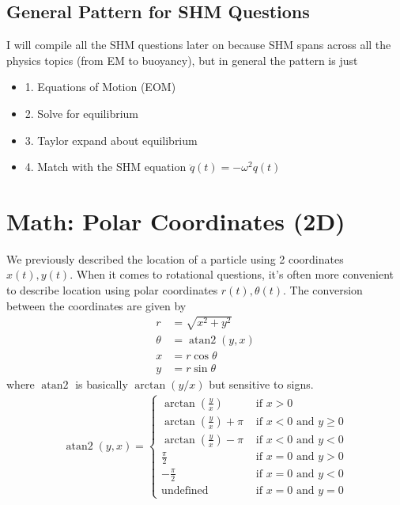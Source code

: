 \documentclass{article}
\begin{document}
\subsection{General Pattern for SHM Questions}
I will compile all the SHM questions later on because SHM spans across all the physics topics (from EM to buoyancy), but in general the pattern is just 
\begin{itemize}
    \item[] 1. Equations of Motion (EOM)
    \item[] 2. Solve for equilibrium
    \item[] 3. Taylor expand about equilibrium
    \item[] 4. Match with the SHM equation $\ddot q(t) = -\omega^2 q(t)$
\end{itemize}
\section{Math: Polar Coordinates (2D)}
\label{sec:polar}
We previously described the location of a particle using 2 coordinates $x(t),y(t)$. When it comes to rotational questions, it's often more convenient to describe location using polar coordinates $r(t), \theta(t)$. The conversion between the coordinates are given by
\begin{align}
    r &= \sqrt{x^2 + y^2} \\
    \theta &= \operatorname{atan2} (y,x) \\ 
    x &= r \cos \theta \\
    y &= r \sin \theta
\end{align}
where $\operatorname{atan2}$ is basically $\arctan (y/x)$ but sensitive to signs.
\begin{align}
    \operatorname{atan2} (y, x)= \begin{cases}\arctan \left(\frac{y}{x}\right) & \text { if } x>0 \\ \arctan \left(\frac{y}{x}\right)+\pi & \text { if } x<0 \text { and } y \geq 0 \\ \arctan \left(\frac{y}{x}\right)-\pi & \text { if } x<0 \text { and } y<0 \\ \frac{\pi}{2} & \text { if } x=0 \text { and } y>0 \\ -\frac{\pi}{2} & \text { if } x=0 \text { and } y<0 \\ \text {undefined } & \text { if } x=0 \text { and } y=0 \end{cases} \label{eq:atan2}
\end{align}
\end{document}
